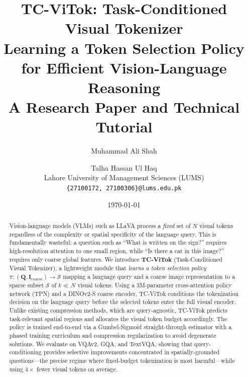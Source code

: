 \documentclass[12pt,a4paper]{article}
\newcommand{\mI}{\mathbf{I}}     %
\newcommand{\mQ}{\mathbf{Q}}     %
\begin{document}

\title{
  \textbf{TC-ViTok: Task-Conditioned Visual Tokenizer} \\
  \large Learning a Token Selection Policy for Efficient Vision-Language Reasoning \\[0.5em]
  \normalsize A Research Paper and Technical Tutorial
}

\author{
  Muhammad Ali Shah \and Talha Hassan Ul Haq \\[0.3em]
  Lahore University of Management Sciences (LUMS) \\
  \texttt{\{27100172, 27100306\}@lums.edu.pk}
}

\date{\today}

\maketitle
\thispagestyle{empty}

\begin{abstract}

Vision-language models (VLMs) such as LLaVA process a \emph{fixed} set of $N$
visual tokens regardless of the complexity or spatial specificity of the language
query. This is fundamentally wasteful: a question such as ``What is written on
the sign?'' requires high-resolution attention to one small region, while ``Is
there a cat in this image?'' requires only coarse global features. We introduce
\textbf{TC-ViTok} (Task-Conditioned Visual Tokenizer), a lightweight module that
\emph{learns a token selection policy} $\pi\colon (\mQ, \mI_{\mathrm{coarse}})
\to \mathcal{S}$ mapping a language query and a coarse image representation to a
sparse subset $\mathcal{S}$ of $k \ll N$ visual tokens. Using a 3M-parameter
cross-attention policy network (TPN) and a DINOv2-S coarse encoder, TC-ViTok
conditions the tokenization decision on the language query before the selected
tokens enter the full visual encoder. Unlike existing compression methods, which
are query-agnostic, TC-ViTok predicts task-relevant spatial regions and allocates
the visual token budget accordingly. The policy is trained end-to-end via a
Gumbel-Sigmoid straight-through estimator with a phased training curriculum and
compression regularization to avoid degenerate solutions. We evaluate on VQAv2,
GQA, and TextVQA, showing that query-conditioning provides selective improvements
concentrated in spatially-grounded questions---the precise regime where fixed-budget
tokenization is most harmful---while using $4\times$ fewer visual tokens on average.

\end{abstract}
\end{document}
